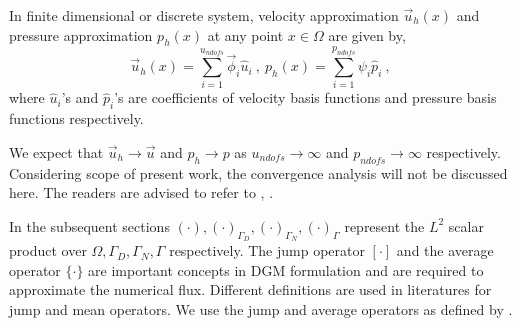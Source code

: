 \documentclass[graybox]{svmult}
\begin{document}
In finite dimensional or discrete system, velocity approximation $\overrightarrow{u}_h(x)$ and pressure approximation $p_h(x)$ at any point $x \in \Omega$ are given by,
\begin{equation}\label{velocity_pressure_coefficients}
\overrightarrow{u}_h(x) = \sum\limits_{i=1}^{u_{ndofs}} \overrightarrow{\phi}_i \hat{u}_i \ , \
p_h(x) = \sum\limits_{i=1}^{p_{ndofs}} \psi_i \hat{p}_i \ ,
\end{equation}
where $\hat{u}_i$'s and $\hat{p}_i$'s are coefficients of velocity basis functions and pressure basis functions respectively. 

We expect that $\overrightarrow{u}_h \rightarrow \overrightarrow{u}$ and $p_h \rightarrow p$ as $u_{ndofs} \rightarrow \infty$ and $p_{ndofs} \rightarrow \infty$ respectively. Considering scope of present work, the convergence analysis will not be discussed here. The readers are advised to refer to \cite{pacciarini}, \cite{riviere}. 


In the subsequent sections $\left( \cdot \right),\left( \cdot \right)_{\Gamma_D},\left( \cdot \right)_{\Gamma_N},\left( \cdot \right)_{\Gamma}$ represent the $L^2$ scalar product over $\Omega,\Gamma_D,\Gamma_N,\Gamma$ respectively. The jump operator $\left[ \cdot \right]$ and the average operator $\lbrace \cdot \rbrace$ are important concepts in DGM formulation and are required to approximate the numerical flux. Different definitions are used in literatures for jump and mean operators. We use the jump and average operators as defined by \cite{jump_mean_operator}.
\end{document}
